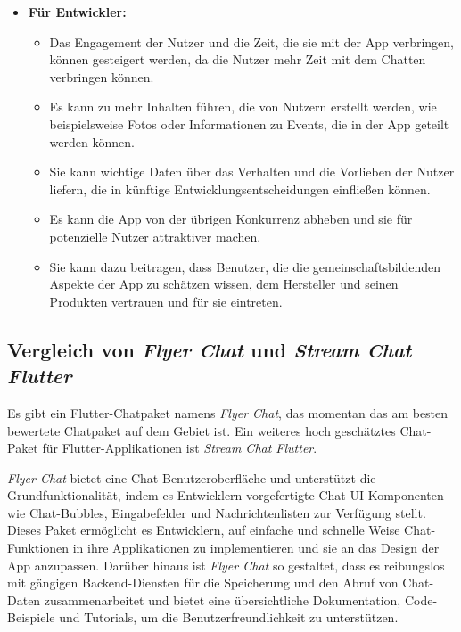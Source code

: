 \begin{itemize}
  \item \textbf{Für Entwickler:}
        \begin{itemize}
          \item {Das Engagement der Nutzer und die Zeit, die sie mit der App verbringen, können gesteigert werden, da die Nutzer mehr Zeit mit dem Chatten verbringen können.}
          \item {Es kann zu mehr Inhalten führen, die von Nutzern erstellt werden, wie beispielsweise Fotos oder Informationen zu Events, die in der App geteilt werden können.}
          \item {Sie kann wichtige Daten über das Verhalten und die Vorlieben der Nutzer liefern, die in künftige Entwicklungsentscheidungen einfließen können.}
          \item {Es kann die App von der übrigen Konkurrenz abheben und sie für potenzielle Nutzer attraktiver machen.}
          \item {Sie kann dazu beitragen, dass Benutzer, die die gemeinschaftsbildenden Aspekte der App zu schätzen wissen, dem Hersteller und seinen Produkten vertrauen und für sie eintreten.}
        \end{itemize}
\end{itemize}

\subsection{Vergleich von \textit{Flyer Chat} und \textit{Stream Chat Flutter}}

Es gibt ein Flutter-Chatpaket namens \textit{Flyer Chat}, das momentan das am besten bewertete Chatpaket auf dem Gebiet ist. Ein weiteres hoch geschätztes Chat-Paket für Flutter-Applikationen ist \textit{Stream Chat Flutter}.

\textit{Flyer Chat} bietet eine Chat-Benutzeroberfläche und unterstützt die Grundfunktionalität, indem es Entwicklern vorgefertigte Chat-UI-Komponenten wie Chat-Bubbles, Eingabefelder und Nachrichtenlisten zur Verfügung stellt. Dieses Paket ermöglicht es Entwicklern, auf einfache und schnelle Weise Chat-Funktionen in ihre Applikationen zu implementieren und sie an das Design der App anzupassen. Darüber hinaus ist \textit{Flyer Chat} so gestaltet, dass es reibungslos mit gängigen Backend-Diensten für die Speicherung und den Abruf von Chat-Daten zusammenarbeitet und bietet eine übersichtliche Dokumentation, Code-Beispiele und Tutorials, um die Benutzerfreundlichkeit zu unterstützen.

